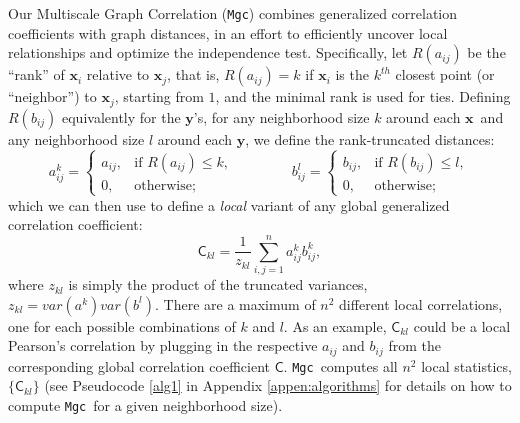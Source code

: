 \documentclass[11pt]{article}
\newcommand{\note}[2][]{\added[#1,remark={#2}]{}}
\providecommand{\sct}[1]{{\sc \texttt{#1}}}
\providecommand{\mb}[1]{\boldsymbol{#1}}
\newcommand{\G}{\mathsf{C}}
\newcommand{\Mgc}{\sct{Mgc}}
\newcommand{\cs}[1]{{\note{cs: #1}}}
\newcommand{\mbx}{\ensuremath{\mb{x}}}
\newcommand{\mby}{\ensuremath{\mb{y}}}
\begin{document}
Our Multiscale Graph Correlation (\Mgc) combines generalized correlation coefficients with  graph distances, in an effort to efficiently uncover local relationships and optimize the independence test.  Specifically, let $R(a_{ij})$  be the ``rank'' of $\mbx_i$ relative to $\mbx_j$, that is, $R(a_{ij})=k$ if $\mbx_i$ is the $k^{th}$ closest point (or ``neighbor'') to $\mbx_j$, starting from $1$, and the minimal rank is used for ties.  Defining $R(b_{ij})$ equivalently for the \mby's, for any neighborhood size $k$ around each \mbx~and any neighborhood size $l$ around each \mby, 
we define the rank-truncated distances:
\begin{equation}
\label{localCoef2}
    a_{ij}^k=
    \begin{cases}
      a_{ij}, & \text{if } R(a_{ij}) \leq k, \\
      0, & \text{otherwise};
    \end{cases} \qquad \qquad
    b_{ij}^l=
    \begin{cases}
      b_{ij}, & \text{if } R(b_{ij}) \leq l, \\
      0, & \text{otherwise};
    \end{cases}
\end{equation}
which we can then use to define  a \emph{local} variant of any global generalized correlation coefficient:
\begin{equation}
\label{localCoef}
\G_{kl}=\dfrac{1}{z_{kl}} \textstyle \sum_{i,j=1}^n a_{ij}^k b_{ij}^k,
\end{equation}
where $z_{kl}$ is simply the product of the truncated variances, $z_{kl}=var(a^k) var(b^l)$. There are a maximum of  $n^2$ different local correlations, one for each possible combinations of $k$ and $l$.
As an example, $\G_{kl}$ could be a local Pearson's correlation by plugging in the respective $a_{ij}$ and $b_{ij}$ from the corresponding global correlation coefficient $\G$. 
\cs{i took this out, it is a technical detail ``$\max(R(a_{ij})) \times \max(R(a_{ij}))$ local correlations, which equals $n^2$ when there exists no repeating point in the data.''}
\Mgc~computes all $n^2$ local statistics, $\{\G_{kl}\}$ (see Pseudocode \ref{alg1} in Appendix \ref{appen:algorithms} for details on how to compute \Mgc~for a given neighborhood size).
\end{document}
